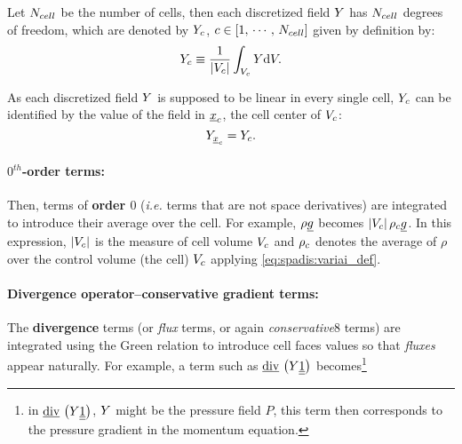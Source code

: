 Let $\ncell$ be the number of cells, then each discretized field $\varia$ has $\ncell$ degrees of freedom,
which are denoted by $\varia_\celli$, $\celli \in \left[ 1 , \, \cdots , \, \ncell \right]$ given by definition by:
\begin{equation}\label{eq:spadis:variai_def}
\varia_{\celli} \equiv \dfrac{1}{\norm{\vol{\celli}}}\int_{\vol{\celli}} \varia \dd \vol{}.
\end{equation}

As each discretized field $\varia$ is supposed to be linear in every single cell, $\varia_{\celli}$ can be identified
by the value of the field in $\centi$, the cell center of $\vol{\celli}$:
\begin{equation}\label{eq:spadis:variai_id}
\varia_{\centi} = \varia_{\celli}.
\end{equation}

\paragraph{$0^{th}$-order terms:}
Then, terms of \textbf{order $0$} (\emph{i.e.} terms that are not space
derivatives) are integrated to introduce their average over the cell. For
example, $\rho \vect{g}$ becomes $\norm{\vol{\celli}} \rho_{\celli} \vect{g}$.
In this expression, $\norm{\vol{\celli}}$ is the measure of cell volume $\vol{\celli}$ and
$\rho_{\celli}$ denotes the average of $\rho $ over the control volume
(the cell) $\vol{\celli}$ applying \eqref{eq:spadis:variai_def}.

\paragraph{Divergence operator--conservative gradient terms:}
The \textbf{divergence} terms (or \emph{flux} terms, or again \emph{conservative}8
terms) are integrated using the Green relation to introduce cell faces
values so that \emph{fluxes} appear naturally. For example, a term such as
$\divv \left( \varia \tens{1}\right)$ becomes\footnote{%
in $\divv \left( \varia \tens{1}\right)$, $\varia$ might be the pressure field $P$, this term then corresponds to the pressure gradient
in the momentum equation.
}%


